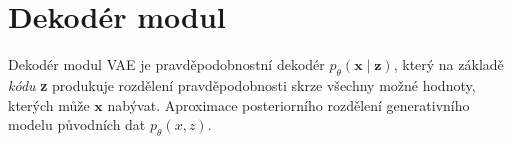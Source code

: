 \section{Dekodér modul}
\label{sec:vae_decoder}
Dekodér modul VAE je pravděpodobnostní dekodér $p_\theta(\textbf{x}\mid\textbf{z})$,
který na základě \emph{kódu} \textbf{z} produkuje rozdělení pravděpodobnosti skrze všechny možné hodnoty, kterých může $\textbf{x}$ nabývat.
Aproximace posteriorního rozdělení generativního modelu původních dat $p_\theta(x, z)$. \cite{Kingma2014}